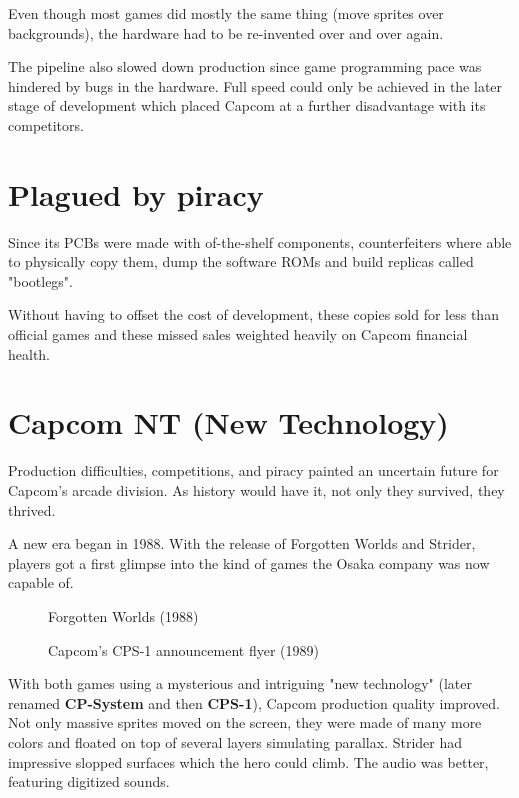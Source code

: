 Even though most games did mostly the same thing (move sprites over backgrounds), the hardware had to be re-invented over and over again. 

The pipeline also slowed down production since game programming pace was hindered by bugs in the hardware. Full speed could only be achieved in the later stage of development which placed Capcom at a further disadvantage with its competitors.





\section{Plagued by piracy}
Since its PCBs were made with of-the-shelf components, counterfeiters where able to physically copy them, dump the software ROMs and build replicas called "bootlegs". 

Without having to offset the cost of development, these copies sold for less than official games and these missed sales weighted heavily on Capcom financial health. 




\section{Capcom NT (New Technology)}
Production difficulties, competitions, and piracy painted an uncertain future for Capcom's arcade division. As history would have it, not only they survived, they thrived.

A new era began in 1988. With the release of Forgotten Worlds and Strider, players got a first glimpse into the kind of games the Osaka company was now capable of.  



\label{nin_fw}
\begin{figure}[H]
\caption*{Forgotten Worlds (1988)}
\end{figure}



 
\label{fw_flyer}
  \begin{figure}[H]
  \caption*{Capcom's CPS-1 announcement flyer (1989)}
  \end{figure}

With both games using a mysterious and intriguing "new technology" (later renamed \textbf{CP-System} and then \textbf{CPS-1}), Capcom production quality improved. Not only massive sprites moved on the screen, they were made of many more colors and floated on top of several layers simulating parallax. Strider had impressive slopped surfaces which the hero could climb. The audio was better, featuring digitized sounds.

